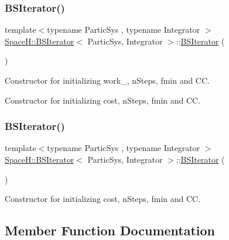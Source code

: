 \subsubsection{\texorpdfstring{B\+S\+Iterator()}{BSIterator()}\hspace{0.1cm}{\footnotesize\ttfamily [1/2]}}
{\footnotesize\ttfamily template$<$typename Partic\+Sys , typename Integrator $>$ \\
\mbox{\hyperlink{class_space_h_1_1_b_s_iterator}{Space\+H\+::\+B\+S\+Iterator}}$<$ Partic\+Sys, Integrator $>$\+::\mbox{\hyperlink{class_space_h_1_1_b_s_iterator}{B\+S\+Iterator}} (\begin{DoxyParamCaption}{ }\end{DoxyParamCaption})}



Constructor for initializing work\+\_\+, n\+Steps, fmin and CC. 

Constructor for initializing cost, n\+Steps, fmin and CC. \mbox{\label{class_space_h_1_1_b_s_iterator_aef64ddf4540fa44e7c408e0ed7caabb2}} 
\subsubsection{\texorpdfstring{B\+S\+Iterator()}{BSIterator()}\hspace{0.1cm}{\footnotesize\ttfamily [2/2]}}
{\footnotesize\ttfamily template$<$typename Partic\+Sys , typename Integrator $>$ \\
\mbox{\hyperlink{class_space_h_1_1_b_s_iterator}{Space\+H\+::\+B\+S\+Iterator}}$<$ Partic\+Sys, Integrator $>$\+::\mbox{\hyperlink{class_space_h_1_1_b_s_iterator}{B\+S\+Iterator}} (\begin{DoxyParamCaption}{ }\end{DoxyParamCaption})}



Constructor for initializing cost, n\+Steps, fmin and CC. 



\subsection{Member Function Documentation}
\mbox{\label{class_space_h_1_1_b_s_iterator_aac17462f691d6e8c1adee5d14f066e75}} 
